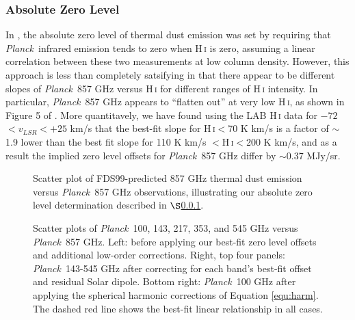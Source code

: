 \documentclass{emulateapj}
\newcommand{\PLANCK}{{\it Planck}}
\begin{document}
\subsubsection{Absolute Zero Level}
\label{sec:zp_abs}
In \cite{planckdust}, the absolute zero level of thermal dust emission was set 
by requiring that \PLANCK~infrared emission tends to zero when H\,\textsc{i} is
zero, assuming a linear correlation between these two measurements at low 
column density. However, this approach is less than completely satsifying in 
that there appear to be different slopes of \PLANCK~857 GHz versus 
H\,\textsc{i} for different ranges of H\,\textsc{i} intensity. In particular, 
\PLANCK~857 GHz appears to ``flatten out'' at very low H\,\textsc{i}, as shown
in Figure 5 of \cite{planckdust}. More quantitavely, we have found using the 
LAB H\,\textsc{i} data \citep{lab} for $-72$$<$$v_{LSR}$$<$$+25$ km/s that the 
best-fit slope for H\,\textsc{i}$<$70 K km/s is a factor of $\sim$1.9 lower 
than the best fit slope for 110 K km/s $<$H\,\textsc{i}$<$200 K km/s, and as a 
result the implied zero level offsets for \PLANCK~857 GHz differ by $\sim$0.37 
MJy/sr.

\begin{figure}
\begin{center}
\caption{\label{fig:fdsref} Scatter plot of FDS99-predicted 857 GHz thermal
dust emission versus \PLANCK~857 GHz observations, illustrating our absolute 
zero level determination described in $\S$\ref{sec:zp_abs}.}
\end{center}
\end{figure}

\begin{figure}
\begin{center}
\caption{\label{fig:dip}  Scatter plots of \PLANCK~100, 143, 217, 353, and 545 
GHz versus \PLANCK~857 GHz. Left: before applying our best-fit zero level 
offsets and additional low-order corrections. Right, top four panels: 
\PLANCK~143-545 GHz after correcting for each band's best-fit offset and 
residual Solar dipole. Bottom right: \PLANCK~100 GHz after applying the 
spherical harmonic corrections of Equation \ref{equ:harm}. The dashed red line 
shows the best-fit linear relationship in all cases.}
\end{center}
\end{figure}
\end{document}
